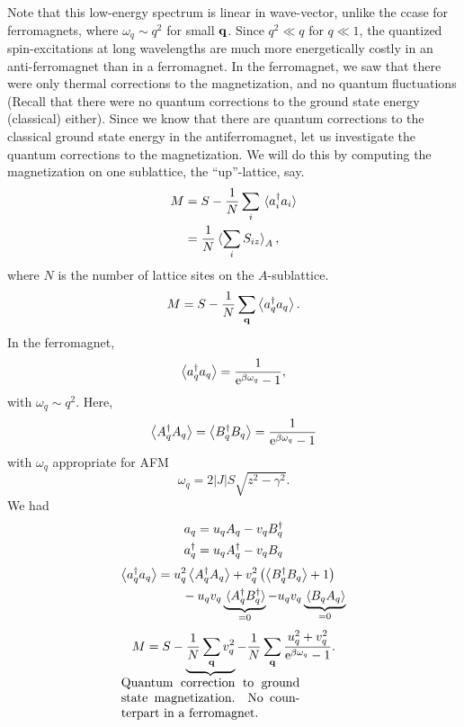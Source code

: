 Note that this low-energy spectrum is linear in wave-vector, unlike the ccase for ferromagnets, where $\omega_q \sim q^2$ for small $\vb{q}$. Since $q^2 \ll q$ for $q\ll 1$, the quantized spin-excitations at long wavelengths are much more energetically costly in an anti-ferromagnet than in a ferromagnet. 
In the ferromagnet, we saw that there were only thermal corrections to the magnetization, and no quantum fluctuations (Recall that there were no quantum corrections to the ground state energy (classical) either).
Since we know that there are quantum corrections to the classical ground state energy in the antiferromagnet, let us investigate the quantum corrections to the magnetization.
We will do this by computing the magnetization on one sublattice, the ``up''-lattice, say. 
\begin{align}
	M &=S - \frac{1}{N}\sum_{i}\ev*{a_{i}^{\dg}a_{i}}\\
	&= \frac{1}{N}\ev*{\sum_{i}S_{iz}}_A,
\end{align}
where $N$ is the number of lattice sites on the $A$-sublattice.
\begin{equation}
	M = S - \frac{1}{N}\sum_{\vq}\ev{a_{q}^{\dg}a_{q}}.
\end{equation}
In the ferromagnet, 
\begin{equation}
	\ev{a_{q}^{\dg}a_{q}} = \frac{1}{\e^{\beta\omega_q}-1}, 
\end{equation}
with $\omega_q \sim q^2$. Here, 
\begin{equation}
		\ev{A_{q}^{\dg}A_{q}}=	\ev{B_{q}^{\dg}B_{q}} = \frac{1}{\e^{\beta\omega_q}-1}
\end{equation}
with $\omega_q$ appropriate for AFM
\begin{equation}
	\omega_q = 2|J|S\sqrt{z^2-\gamma^2}.
\end{equation}
We had 
\begin{align*}
	a_{q} &= u_{q}A_{q}-v_{q}B_{q}^{\dagger} \\ a_{q}^{\dagger} &= u_{q}A_{q}^{\dagger}-v_{q}B_{q}
\end{align*}
\begin{align*}
	\ev{a_{q}^{\dg}a_{q}} &= u_{q}^2\ev{A_{q}^{\dg}A_{q}} + v_q^2\left (\ev{B_{q}^{\dg}B_{q}}+1\right ) \\
	&\qquad  - u_qv_q \underbrace{\ev*{A_{q}^{\dg}B_{q}^{\dg}}}_{=0} - u_qv_q\underbrace{\ev*{B_{q}A_{q}}}_{=0}
\end{align*}
\begin{equation}
	M = S - \underbrace{\frac{1}{N}\sum_{\vq}v_q^2}_{\mathclap{\parbox[h]{5cm}{Quantum correction to ground state magnetization. No counterpart in a ferromagnet.}}} - \frac{1}{N}\sum_{\vq}\frac{u_q^2 + v_q^2}{\e^{\beta\omega_q}-1}.
\end{equation}
